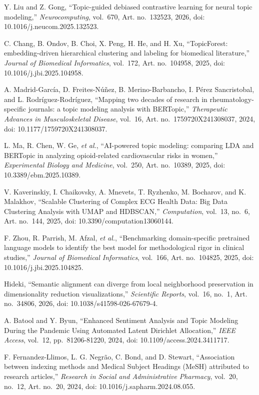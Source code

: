  Y. Liu and Z. Gong, ``Topic-guided debiased contrastive learning for neural topic modeling,'' \textit{Neurocomputing}, vol.~670, Art. no.~132523, 2026, doi: 10.1016/j.neucom.2025.132523.

 C. Chang, B. Ondov, B. Choi, X. Peng, H. He, and H. Xu, ``TopicForest: embedding-driven hierarchical clustering and labeling for biomedical literature,'' \textit{Journal of Biomedical Informatics}, vol.~172, Art. no.~104958, 2025, doi: 10.1016/j.jbi.2025.104958.

 A. Madrid-García, D. Freites-Núñez, B. Merino-Barbancho, I. Pérez Sancristobal, and L. Rodríguez-Rodríguez, ``Mapping two decades of research in rheumatology-specific journals: a topic modeling analysis with BERTopic,'' \textit{Therapeutic Advances in Musculoskeletal Disease}, vol.~16, Art. no.~1759720X241308037, 2024, doi: 10.1177/1759720X241308037.

 L. Ma, R. Chen, W. Ge, \textit{et al.}, ``AI-powered topic modeling: comparing LDA and BERTopic in analyzing opioid-related cardiovascular risks in women,'' \textit{Experimental Biology and Medicine}, vol.~250, Art. no.~10389, 2025, doi: 10.3389/ebm.2025.10389.

 V. Kaverinskiy, I. Chaikovsky, A. Mnevets, T. Ryzhenko, M. Bocharov, and K. Malakhov, ``Scalable Clustering of Complex ECG Health Data: Big Data Clustering Analysis with UMAP and HDBSCAN,'' \textit{Computation}, vol.~13, no.~6, Art. no.~144, 2025, doi: 10.3390/computation13060144.

 F. Zhou, R. Parrish, M. Afzal, \textit{et al.}, ``Benchmarking domain-specific pretrained language models to identify the best model for methodological rigor in clinical studies,'' \textit{Journal of Biomedical Informatics}, vol.~166, Art. no.~104825, 2025, doi: 10.1016/j.jbi.2025.104825.

 Hideki, ``Semantic alignment can diverge from local neighborhood preservation in dimensionality reduction visualizations,'' \textit{Scientific Reports}, vol.~16, no.~1, Art. no.~34806, 2026, doi: 10.1038/s41598-026-67679-4.

 A. Batool and Y. Byun, ``Enhanced Sentiment Analysis and Topic Modeling During the Pandemic Using Automated Latent Dirichlet Allocation,'' \textit{IEEE Access}, vol.~12, pp.~81206-81220, 2024, doi: 10.1109/access.2024.3411717.

 F. Fernandez-Llimos, L. G. Negrão, C. Bond, and D. Stewart, ``Association between indexing methods and Medical Subject Headings (MeSH) attributed to research articles,'' \textit{Research in Social and Administrative Pharmacy}, vol.~20, no.~12, Art. no.~20, 2024, doi: 10.1016/j.sapharm.2024.08.055.

